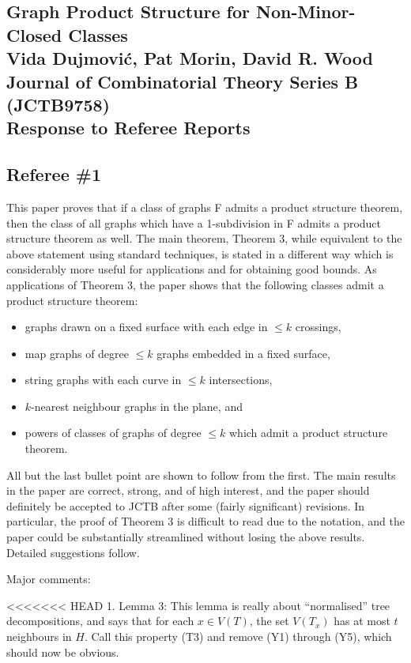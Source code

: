 \documentclass[12pt]{article}
\begin{document}
\subsection*{Graph Product Structure for Non-Minor-Closed Classes\\
Vida Dujmovi\'c, Pat Morin, David R. Wood\\
Journal of Combinatorial Theory Series B (JCTB9758)\\
Response to Referee Reports}
		
\subsection*{Referee \#1}

This paper proves that if a class of graphs F admits a product structure
theorem, then the class of all graphs which have a 1-subdivision in F admits
a product structure theorem as well. The main theorem, Theorem 3, while
equivalent to the above statement using standard techniques, is stated in
a different way which is considerably more useful for applications and for
obtaining good bounds. As applications of Theorem 3, the paper shows that
the following classes admit a product structure theorem:

\begin{itemize}
\item graphs drawn on a fixed surface with each edge in $\leq k$ crossings,
\item map graphs of degree $\leq k$ graphs embedded in a fixed surface,
\item string graphs with each curve in $\leq k$ intersections,
\item $k$-nearest neighbour graphs in the plane, and
\item powers of classes of graphs of degree $\leq k$ which admit a product structure theorem.
\end{itemize}

All but the last bullet point are shown to follow from the first.
The main results in the paper are correct, strong, and of high interest,
and the paper should definitely be accepted to JCTB after some
(fairly significant) revisions. In particular, the proof of Theorem 3 is
difficult to read due to the notation, and the paper could be substantially
streamlined without losing the above results. Detailed suggestions follow.

Major comments:

<<<<<<< HEAD
1. Lemma 3: This lemma is really about ``normalised'' tree decompositions, and says that for each $x \in V(T)$, the set $V(T_x)$ has at most $t$ neighbours in $H$. Call this property (T3) and remove (Y1)  through (Y5), which should now be obvious.
\end{document}
